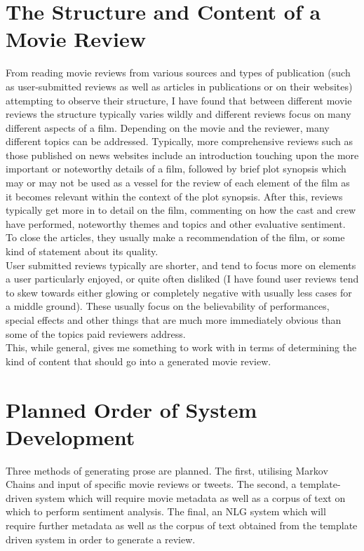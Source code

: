 \section{The Structure and Content of a Movie Review}
From reading movie reviews from various sources and types of publication (such as user-submitted reviews as well as articles in publications or on their websites) attempting to observe their structure, I have found that between different movie reviews the structure typically varies wildly and different reviews focus on many different aspects of a film. Depending on the movie and the reviewer, many different topics can be addressed.
Typically, more comprehensive reviews such as those published on news websites include an introduction touching upon the more important or noteworthy details of a film, followed by brief plot synopsis which may or may not be used as a vessel for the review of each element of the film as it becomes relevant within the context of the plot synopsis. 
After this, reviews typically get more in to detail on the film, commenting on how the cast and crew have performed, noteworthy themes and topics and other evaluative sentiment.
To close the articles, they usually make a recommendation of the film, or some kind of statement about its quality. \\
User submitted reviews typically are shorter, and tend to focus more on elements a user particularly enjoyed, or quite often disliked (I have found user reviews tend to skew towards either glowing or completely negative with usually less cases for a middle ground). These usually focus on the believability of performances, special effects and other things that are much more immediately obvious than some of the topics paid reviewers address.\\
This, while general, gives me something to work with in terms of determining the kind of content that should go into a generated movie review.\\



\section{Planned Order of System Development}
Three methods of generating prose are planned. The first, utilising Markov Chains and input of specific movie reviews or tweets. The second, a template-driven system which will require movie metadata as well as a corpus of text on which to perform sentiment analysis.
The final, an NLG system which will require further metadata as well as the corpus of text obtained from the template driven system in order to generate a review.\\

